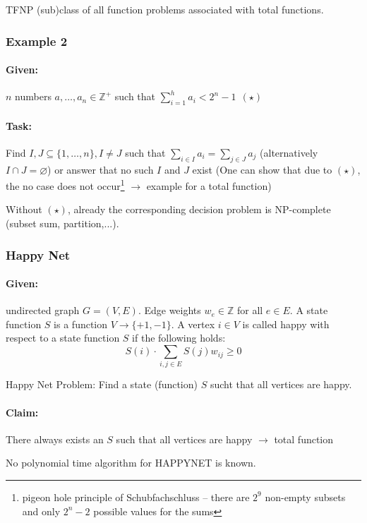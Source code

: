 \documentclass[11pt]{article}
\theoremstyle{definition}
\theoremstyle{definition}
\begin{document}
TFNP (sub)class of all function problems associated with total functions.

\subsubsection{Example 2}
\paragraph{Given:} $ n $ numbers $ a, \dots, a_n \in \mathbb{Z}^+ $ such that $ \sum \limits_{i = 1}^h a_i < 2^n - 1 ~~ (\star)$
\paragraph{Task:} Find $ I , J \subseteq \{1, \dots, n\}, I \neq J $ such that $ \sum \limits_{i \in I} a_i = \sum \limits_{j\in J} a_j$ (alternatively $ I \cap J = \varnothing $) or answer that no such $ I $ and $ J $ exist (One can show that due to $ (\star) $, the no case does not occur\footnote{pigeon hole principle of Schubfachschluss – there are $ 2^9 $ non-empty subsets and only $2^n-2$ possible values for the sums} $ \rightarrow $ example for a total function)

Without $(\star)$, already the corresponding decision problem is NP-complete (subset sum, partition,...).

\subsubsection{Happy Net}
\paragraph{Given:} undirected graph $ G = (V, E) $. Edge weights $ w_e \in \mathbb{Z} $ for all $ e \in E $. A state function $ S $ is a function $ V \rightarrow \{+1, -1\} $. A vertex $ i \in V $ is called happy with respect to a state function $ S $ if the following holds:
\[ S (i) \cdot \sum \limits_{i, j \in E} S(j) w_{ij} \geq 0 \]

Happy Net Problem: Find a state (function) $ S $ sucht that all vertices are happy.
\paragraph{Claim: } There always exists an $ S $ such that all vertices are happy $ \rightarrow $ total function

No polynomial time algorithm for HAPPYNET is known.
\end{document}
